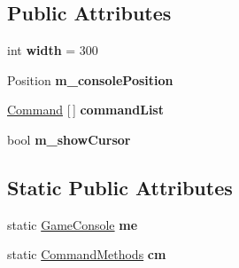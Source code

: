 \subsection*{Public Attributes}
\begin{DoxyCompactItemize}
\item 
\mbox{\label{class_lerp2_a_p_i_1_1_game_1_1_game_console_aeb707b7f970042ffeb28ae650deb5947}} 
int {\bfseries width} = 300
\item 
\mbox{\label{class_lerp2_a_p_i_1_1_game_1_1_game_console_adb8a5904b26ad317c05286e36ddbc0cd}} 
Position {\bfseries m\+\_\+console\+Position}
\item 
\mbox{\label{class_lerp2_a_p_i_1_1_game_1_1_game_console_a53a21ed9b0ec7656aec18321a3d48d8a}} 
\hyperlink{class_lerp2_a_p_i_1_1_game_1_1_command}{Command} \mbox{[}$\,$\mbox{]} {\bfseries command\+List}
\item 
\mbox{\label{class_lerp2_a_p_i_1_1_game_1_1_game_console_a6a564e5b24e94a40789c842b6369b103}} 
bool {\bfseries m\+\_\+show\+Cursor}
\end{DoxyCompactItemize}
\subsection*{Static Public Attributes}
\begin{DoxyCompactItemize}
\item 
\mbox{\label{class_lerp2_a_p_i_1_1_game_1_1_game_console_a9182dad70d48386914d0aa424eee2cdf}} 
static \hyperlink{class_lerp2_a_p_i_1_1_game_1_1_game_console}{Game\+Console} {\bfseries me}
\item 
\mbox{\label{class_lerp2_a_p_i_1_1_game_1_1_game_console_ad986d8fae40bb96cd778d1608f090ea6}} 
static \hyperlink{class_command_methods}{Command\+Methods} {\bfseries cm}
\end{DoxyCompactItemize}
